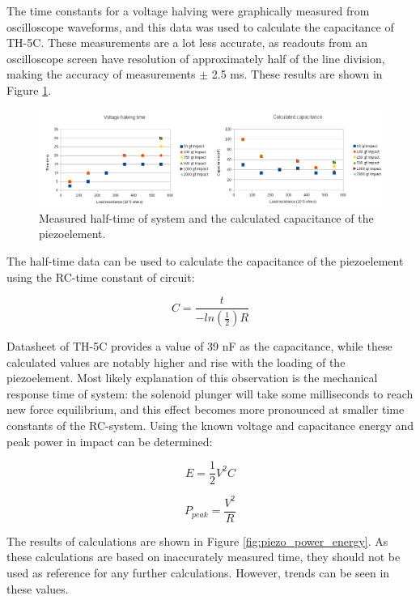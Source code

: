 The time constants for a voltage halving were graphically measured from oscilloscope waveforms, and this data was used to calculate the capacitance of TH-5C. These measurements are a lot less accurate, as readouts from an oscilloscope screen have resolution of approximately half of the line division, making the accuracy of measurements $\pm$ 2.5 ms. These results are shown in Figure \ref{fig:piezo_time_capacitance}.

\begin{figure}[htb]
  \begin{center}
  \includegraphics[width=\columnwidth]{images/own_measurement/piezo_capacitance}
  \end{center}
  \caption{Measured half-time of system and the calculated capacitance of the piezoelement.}
  \label{fig:piezo_time_capacitance}
\end{figure}

The half-time data can be used to calculate the capacitance of the piezoelement using the RC-time constant of circuit:

\begin{equation}
  C=\frac{t}{-ln(\frac{1}{2})R} 
\end{equation}

Datasheet of TH-5C provides a value of 39 nF as the capacitance, while these calculated values are notably higher and rise with the loading of the piezoelement. Most likely explanation of this observation is the mechanical response time of system: the solenoid plunger will take some milliseconds to reach new force equilibrium, and this effect becomes more pronounced at smaller time constants of the RC-system. Using the known voltage and capacitance energy and peak power in impact can be determined:
 
\begin{equation}
   E = \frac{1}{2}V^2C
\end{equation}

\begin{equation}
   P_{peak} = \frac{V^2}{R}
\end{equation}
 
The results of calculations are shown in Figure \ref{fig:piezo_power_energy}. As these calculations are based on inaccurately measured time, they should not be used as reference for any further calculations. However, trends can be seen in these values. 
 
